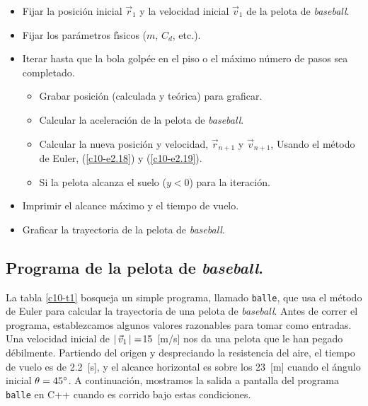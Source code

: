 \begin{table}
\hrulefill
\begin{itemize}
\item Fijar la posici{\'o}n inicial $\vec r_1$ y la velocidad inicial
  $\vec v_1$ de la pelota de {\em baseball}.
\item Fijar los par{\'a}metros f{\'\i}sicos ($m$, $C_d$, etc.).
\item Iterar hasta que la bola golp\'ee en el piso o el m{\'a}ximo n{\'u}mero de
  pasos sea completado.
  \begin{itemize}
    \item Grabar posici{\'o}n (calculada y te{\'o}rica) para graficar.
    \item Calcular la aceleraci{\'o}n de la pelota de {\em baseball}.
    \item Calcular la nueva posici{\'o}n y velocidad, $\vec r_{n+1}$ y
      $\vec v_{n+1}$, Usando el m{\'e}todo de Euler, (\ref{c10-e2.18}) y
      (\ref{c10-e2.19}). 
    \item Si la pelota alcanza el suelo ($y<0$) para la iteraci{\'o}n.
\end{itemize}
\item Imprimir el alcance m{\'a}ximo y el tiempo de vuelo.
\item Graficar la trayectoria de la pelota de {\em baseball}.
\end{itemize}
\caption{Bosquejo del programa {\tt balle}, el cual calcula la trayectoria
  de una pelota de {\em baseball} usando el m{\'e}todo de Euler.}\label{c10-t1}
\hrulefill
\end{table}

\subsection{Programa de la pelota de {\em baseball}.}

La tabla \ref{c10-t1} bosqueja un simple programa, llamado
\verb|balle|, que usa el m{\'e}todo de Euler para calcular la trayectoria
de una pelota de {\em baseball}. Antes de correr el programa,
establezcamos algunos valores razonables para tomar como entradas. Una
velocidad inicial de $\left\lvert\, \vec v_1 \,\right\lvert=$15~[m/s] nos da una pelota
que le han pegado d{\'e}bilmente. Partiendo del origen y despreciando la
resistencia del aire, el tiempo de vuelo es de 2.2~[s], y el alcance
horizontal es sobre los 23~[m] cuando el {\'a}ngulo inicial $\theta=45^\circ$.
A continuaci{\'o}n, mostramos la salida a pantalla del programa
\verb|balle| en C++ cuando es corrido bajo estas condiciones.

